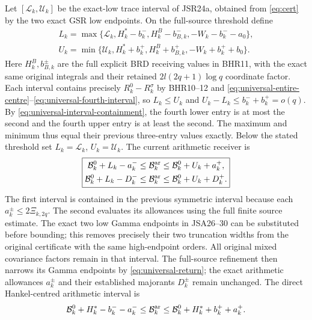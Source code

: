 \documentclass[11pt,a4paper]{article}
\begin{document}
Let $[\mathscr L_k,\mathscr U_k]$ be the exact-low trace
interval of JSR24a, obtained from \eqref{eq:cert} by the two
exact GSR low endpoints. On the full-source threshold define
\begin{equation}
\begin{gathered}
 L_k=\max\{\mathscr L_k,H_k^*-b_k^-,H_k^B-b_{B,k}^-,
                                      -W_k-b_k^--a_0\},\\
 U_k=\min\{\mathscr U_k,H_k^*+b_k^+,H_k^B+b_{B,k}^+,
                                      -W_k+b_k^++b_0\}.
\end{gathered}
\end{equation}
Here $H_k^B,b_{B,k}^\pm$ are the full explicit BRD receiving
values in BHR11, with the exact same original integrals and
their retained $2l(2q+1)\log q$ coordinate factor. Each interval
contains precisely $R_k^0-R_k^\sigma$ by BHR10--12 and
\eqref{eq:universal-entire-centre}--\eqref{eq:universal-fourth-interval},
so $L_k\leq U_k$ and $U_k-L_k\leq b_k^-+b_k^+=o(q)$.
By \eqref{eq:universal-interval-containment}, the fourth lower
entry is at most the second and the fourth upper entry is
at least the second. The maximum and minimum thus equal
their previous three-entry values exactly.
Below the stated threshold set
$L_k=\mathscr L_k$, $U_k=\mathscr U_k$.
The current arithmetic receiver is
\begin{equation}
 \boxed{\begin{aligned}
 \mathcal B_k^0+L_k-a_k^-&\le\mathcal B_k^{\rm ar}
                         \le\mathcal B_k^0+U_k+a_k^+,\\
 \mathcal B_k^0+L_k-D_k^-&\le\mathcal B_k^{\rm ar}
                         \le\mathcal B_k^0+U_k+D_k^+.
 \end{aligned}}\label{eq:arithmeticinterval}
\end{equation}
The first interval is contained in the previous symmetric interval
because each $a_k^\pm\le2\Xi_{k,2q}$. The second evaluates its
allowances using the full finite source estimate. The exact two low
Gamma endpoints in JSA26--30 can be substituted before bounding;
this removes precisely their two truncation widths from the original
certificate with the same high-endpoint orders. All original mixed covariance factors remain in that interval.
The full-source refinement then narrows its Gamma endpoints
by \eqref{eq:universal-return}; the exact arithmetic allowances
$a_k^\pm$ and their established majorants $D_k^\pm$ remain
unchanged. The direct Hankel-centred arithmetic interval is
\begin{equation}
 \mathcal B_k^0+H_k^*-b_k^--a_k^-
 \leq\mathcal B_k^{\rm ar}
 \leq\mathcal B_k^0+H_k^*+b_k^++a_k^+.
\end{equation}
\end{document}

